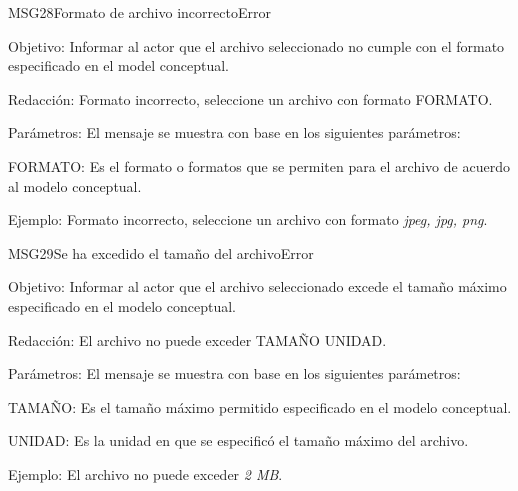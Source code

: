 \begin{mensaje}{MSG28}{Formato de archivo incorrecto}{Error}
    \item[Objetivo:] Informar al actor que el archivo seleccionado no cumple con el formato especificado en el model conceptual.
    \item[Redacción:] Formato incorrecto, seleccione un archivo con formato FORMATO.
    \item[Parámetros:] El mensaje se muestra con base en los siguientes parámetros:
    \begin{Citemize}
	\item FORMATO: Es el formato o formatos que se permiten para el archivo de acuerdo al modelo conceptual.
    \end{Citemize}
    \item[Ejemplo:] Formato incorrecto, seleccione un archivo con formato {\em jpeg, jpg, png}.
\end{mensaje}
\begin{mensaje}{MSG29}{Se ha excedido el tamaño del archivo}{Error}
    \item[Objetivo:] Informar al actor que el archivo seleccionado excede el tamaño máximo especificado en el modelo conceptual.
    \item[Redacción:] El archivo no puede exceder TAMAÑO UNIDAD.
    \item[Parámetros:] El mensaje se muestra con base en los siguientes parámetros:
    \begin{Citemize}
	\item TAMAÑO: Es el tamaño máximo permitido especificado en el modelo conceptual.
	\item UNIDAD: Es la unidad en que se especificó el tamaño máximo del archivo.
    \end{Citemize}
    \item[Ejemplo:] El archivo no puede exceder {\em 2 MB}.
\end{mensaje}

